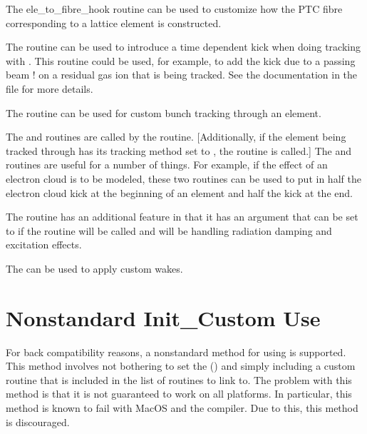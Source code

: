 {{{{{{The {ele_to_fibre_hook} routine can be used to customize how the PTC fibre corresponding to a
\bmad lattice element is constructed. 

The  routine can be used to introduce a time dependent kick
when doing tracking with . This routine could be used, for example, to add the
kick due to a passing beam ! on a residual gas ion that is being tracked. See the documentation in
the file  for more details.

The  routine can be used for custom bunch tracking through an element.

The  and  routines are called by the
 routine. [Additionally, if the element being tracked through has its
tracking method set to , the  routine is called.] The
 and  routines are useful for a number of things. For
example, if the effect of an electron cloud is to be modeled, these two routines can be used to put
in half the electron cloud kick at the beginning of an element and half the kick at the end.

The routine  has an additional feature in that it has an argument
 that can be set to  if the routine  will be
called and  will be handling radiation damping and excitation effects.

The  can be used to apply custom wakes.

\section{Nonstandard Init_Custom Use}

For back compatibility reasons, a nonstandard method for using  is supported.
This method involves not bothering to set the  ()
and simply including a custom  routine that is included in the list
of routines to link to. The problem with this method is that it is not guaranteed to work
on all platforms. In particular, this method is known to fail with MacOS and the 
compiler. Due to this, this method is discouraged. 

}}}}}}
